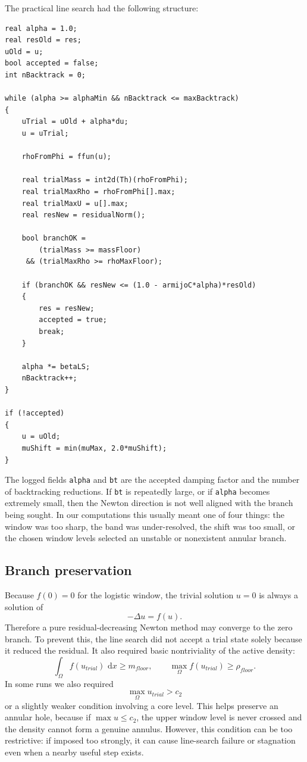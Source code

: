 \documentclass[11pt,a4paper]{article}
\newcommand{\Om}{\Omega}
\newcommand{\dd}{\,\mathrm{d}}
\begin{document}
The practical line search had the following structure:
\begin{lstlisting}[style=ff]
real alpha = 1.0;
real resOld = res;
uOld = u;
bool accepted = false;
int nBacktrack = 0;

while (alpha >= alphaMin && nBacktrack <= maxBacktrack)
{
    uTrial = uOld + alpha*du;
    u = uTrial;

    rhoFromPhi = ffun(u);

    real trialMass = int2d(Th)(rhoFromPhi);
    real trialMaxRho = rhoFromPhi[].max;
    real trialMaxU = u[].max;
    real resNew = residualNorm();

    bool branchOK =
        (trialMass >= massFloor)
     && (trialMaxRho >= rhoMaxFloor);

    if (branchOK && resNew <= (1.0 - armijoC*alpha)*resOld)
    {
        res = resNew;
        accepted = true;
        break;
    }

    alpha *= betaLS;
    nBacktrack++;
}

if (!accepted)
{
    u = uOld;
    muShift = min(muMax, 2.0*muShift);
}
\end{lstlisting}
The logged fields \texttt{alpha} and \texttt{bt} are the accepted damping factor
and the number of backtracking reductions. If \texttt{bt} is repeatedly large,
or if \texttt{alpha} becomes extremely small, then the Newton direction is not
well aligned with the branch being sought. In our computations this usually
meant one of four things: the window was too sharp, the band was under-resolved,
the shift was too small, or the chosen window levels selected an unstable or
nonexistent annular branch.

\subsection{Branch preservation}

Because $f(0)=0$ for the logistic window, the trivial solution $u=0$ is always a
solution of
\begin{equation}
  -\Delta u=f(u).
\end{equation}
Therefore a pure residual-decreasing Newton method may converge to the zero
branch. To prevent this, the line search did not accept a trial state solely
because it reduced the residual. It also required basic nontriviality of the
active density:
\begin{equation}
  \int_\Om f(u_{trial})\,\dd x \geq m_{floor},
  \qquad
  \max_\Om f(u_{trial})\geq \rho_{floor}.
\end{equation}
In some runs we also required
\begin{equation}
  \max_\Om u_{trial}>c_2
\end{equation}
or a slightly weaker condition involving a core level. This helps preserve an
annular hole, because if $\max u\leq c_2$, the upper window level is never
crossed and the density cannot form a genuine annulus. However, this condition
can be too restrictive: if imposed too strongly, it can cause line-search
failure or stagnation even when a nearby useful step exists.
\end{document}
